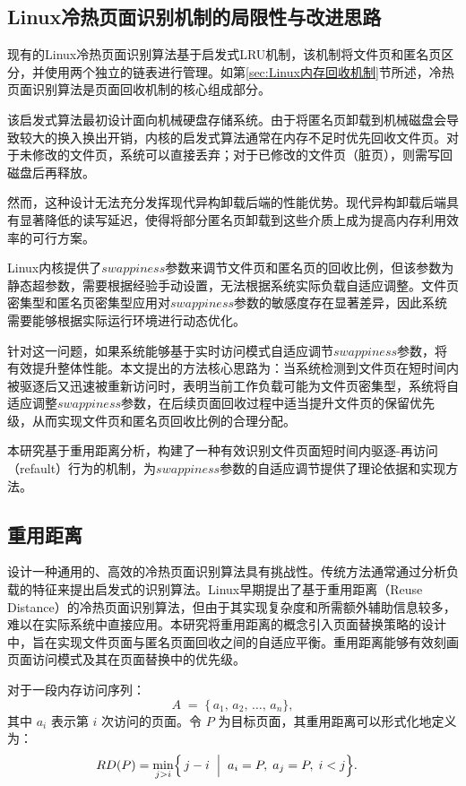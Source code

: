 \subsection{Linux冷热页面识别机制的局限性与改进思路}
现有的Linux冷热页面识别算法基于启发式LRU机制，该机制将文件页和匿名页区分，并使用两个独立的链表进行管理。如第\ref{sec:Linux内存回收机制}节所述，冷热页面识别算法是页面回收机制的核心组成部分。

该启发式算法最初设计面向机械硬盘存储系统。由于将匿名页卸载到机械磁盘会导致较大的换入换出开销，内核的启发式算法通常在内存不足时优先回收文件页。对于未修改的文件页，系统可以直接丢弃；对于已修改的文件页（脏页），则需写回磁盘后再释放。

然而，这种设计无法充分发挥现代异构卸载后端的性能优势。现代异构卸载后端具有显著降低的读写延迟，使得将部分匿名页卸载到这些介质上成为提高内存利用效率的可行方案。

Linux内核提供了\(swappiness\)参数来调节文件页和匿名页的回收比例，但该参数为静态超参数，需要根据经验手动设置，无法根据系统实际负载自适应调整。文件页密集型和匿名页密集型应用对\(swappiness\)参数的敏感度存在显著差异，因此系统需要能够根据实际运行环境进行动态优化。

针对这一问题，如果系统能够基于实时访问模式自适应调节\(swappiness\)参数，将有效提升整体性能。本文提出的方法核心思路为：当系统检测到文件页在短时间内被驱逐后又迅速被重新访问时，表明当前工作负载可能为文件页密集型，系统将自适应调整\(swappiness\)参数，在后续页面回收过程中适当提升文件页的保留优先级，从而实现文件页和匿名页回收比例的合理分配。

本研究基于重用距离分析，构建了一种有效识别文件页面短时间内驱逐-再访问（refault）行为的机制，为\(swappiness\)参数的自适应调节提供了理论依据和实现方法。

\subsection{重用距离}

设计一种通用的、高效的冷热页面识别算法具有挑战性。传统方法通常通过分析负载的特征来提出启发式的识别算法。Linux早期提出了基于重用距离（Reuse Distance）的冷热页面识别算法，但由于其实现复杂度和所需额外辅助信息较多，难以在实际系统中直接应用。本研究将重用距离的概念引入页面替换策略的设计中，旨在实现文件页面与匿名页面回收之间的自适应平衡。重用距离能够有效刻画页面访问模式及其在页面替换中的优先级。

对于一段内存访问序列：
\[
  A \;=\;\{\,a_1,\,a_2,\,\dots,\,a_n\},
\]
其中 \(a_i\) 表示第 \(i\) 次访问的页面。令 \(P\) 为目标页面，其重用距离可以形式化地定义为：
\begin{align}
\label{eq:rd_def}
  RD(P) 
  &= 
  \min_{j>i}\Bigl\{\,j - i
    \;\Bigm|\;
    a_i = P,\;
    a_j = P,\;
    i < j
  \Bigr\}.
\end{align}

